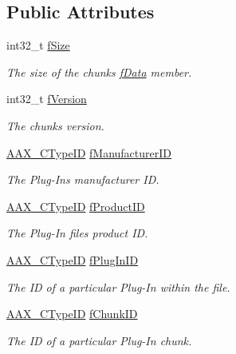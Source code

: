 \subsection*{Public Attributes}
\begin{DoxyCompactItemize}
\item 
int32\+\_\+t \hyperlink{a00125_ac08f37f1ed50eac8ac3ca4bf5494c84d}{f\+Size}
\begin{DoxyCompactList}\small\item\em The size of the chunk\textquotesingle{}s \hyperlink{a00125_abc76d66fffa4a59ee5cfdbdd992c532c}{f\+Data} member. \end{DoxyCompactList}\item 
int32\+\_\+t \hyperlink{a00125_ac114fd94e7b12c235f9c18bcbbc46f06}{f\+Version}
\begin{DoxyCompactList}\small\item\em The chunk\textquotesingle{}s version. \end{DoxyCompactList}\item 
\hyperlink{a00149_ac678f9c1fbcc26315d209f71a147a175}{A\+A\+X\+\_\+\+C\+Type\+I\+D} \hyperlink{a00125_a88197dbb1057c5035370943550a3284e}{f\+Manufacturer\+I\+D}
\begin{DoxyCompactList}\small\item\em The Plug-\/\+In\textquotesingle{}s manufacturer I\+D. \end{DoxyCompactList}\item 
\hyperlink{a00149_ac678f9c1fbcc26315d209f71a147a175}{A\+A\+X\+\_\+\+C\+Type\+I\+D} \hyperlink{a00125_abfaa54962ff0b39cee02cffc777d0038}{f\+Product\+I\+D}
\begin{DoxyCompactList}\small\item\em The Plug-\/\+In file\textquotesingle{}s product I\+D. \end{DoxyCompactList}\item 
\hyperlink{a00149_ac678f9c1fbcc26315d209f71a147a175}{A\+A\+X\+\_\+\+C\+Type\+I\+D} \hyperlink{a00125_af3d433e0a0c022cf84f1cc7dc4862bda}{f\+Plug\+In\+I\+D}
\begin{DoxyCompactList}\small\item\em The I\+D of a particular Plug-\/\+In within the file. \end{DoxyCompactList}\item 
\hyperlink{a00149_ac678f9c1fbcc26315d209f71a147a175}{A\+A\+X\+\_\+\+C\+Type\+I\+D} \hyperlink{a00125_a061e99935a8e743891c4051f1a6ecba2}{f\+Chunk\+I\+D}
\begin{DoxyCompactList}\small\item\em The I\+D of a particular Plug-\/\+In chunk. \end{DoxyCompactList}\item 

\end{DoxyCompactItemize}
